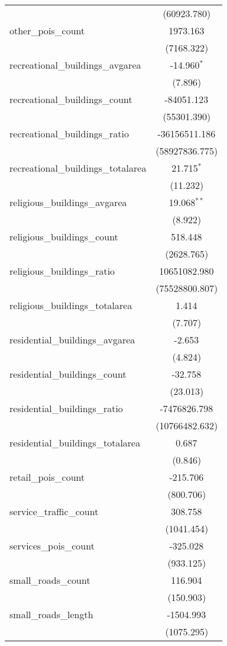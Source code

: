 \begin{table}[!htbp]
\begin{tabular}{@{\extracolsep{5pt}}lc}
  & (60923.780) \\
 other_pois_count & 1973.163$^{}$ \\
  & (7168.322) \\
 recreational_buildings_avgarea & -14.960$^{*}$ \\
  & (7.896) \\
 recreational_buildings_count & -84051.123$^{}$ \\
  & (55301.390) \\
 recreational_buildings_ratio & -36156511.186$^{}$ \\
  & (58927836.775) \\
 recreational_buildings_totalarea & 21.715$^{*}$ \\
  & (11.232) \\
 religious_buildings_avgarea & 19.068$^{**}$ \\
  & (8.922) \\
 religious_buildings_count & 518.448$^{}$ \\
  & (2628.765) \\
 religious_buildings_ratio & 10651082.980$^{}$ \\
  & (75528800.807) \\
 religious_buildings_totalarea & 1.414$^{}$ \\
  & (7.707) \\
 residential_buildings_avgarea & -2.653$^{}$ \\
  & (4.824) \\
 residential_buildings_count & -32.758$^{}$ \\
  & (23.013) \\
 residential_buildings_ratio & -7476826.798$^{}$ \\
  & (10766482.632) \\
 residential_buildings_totalarea & 0.687$^{}$ \\
  & (0.846) \\
 retail_pois_count & -215.706$^{}$ \\
  & (800.706) \\
 service_traffic_count & 308.758$^{}$ \\
  & (1041.454) \\
 services_pois_count & -325.028$^{}$ \\
  & (933.125) \\
 small_roads_count & 116.904$^{}$ \\
  & (150.903) \\
 small_roads_length & -1504.993$^{}$ \\
  & (1075.295) \\

\end{tabular}
\end{table}
